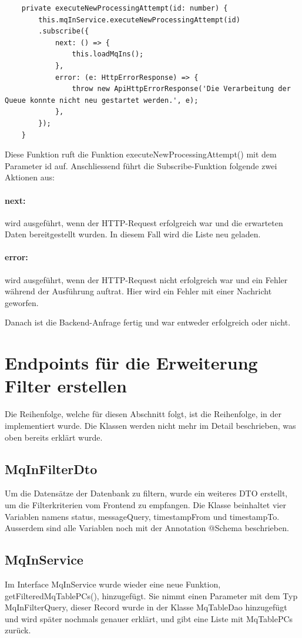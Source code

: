 \begin{verbatim}
	private executeNewProcessingAttempt(id: number) {
		this.mqInService.executeNewProcessingAttempt(id)
		.subscribe({
			next: () => {
				this.loadMqIns();
			},
			error: (e: HttpErrorResponse) => {
				throw new ApiHttpErrorResponse('Die Verarbeitung der Queue konnte nicht neu gestartet werden.', e);
			},
		});
	}
\end{verbatim}

\noindent Diese Funktion ruft die Funktion executeNewProcessingAttempt() mit dem Parameter id auf. Anschliessend führt die Subscribe-Funktion folgende zwei Aktionen aus:

\paragraph{next:} wird ausgeführt, wenn der HTTP-Request erfolgreich war und die erwarteten Daten bereitgestellt wurden. In diesem Fall wird die Liste neu geladen.
\paragraph{error:} wird ausgeführt, wenn der HTTP-Request nicht erfolgreich war und ein Fehler während der Ausführung auftrat. Hier wird ein Fehler mit einer Nachricht geworfen.\newline

\noindent Danach ist die Backend-Anfrage fertig und war entweder erfolgreich oder nicht.

\section{Endpoints für die Erweiterung Filter erstellen}
Die Reihenfolge, welche für diesen Abschnitt folgt, ist die Reihenfolge, in der implementiert wurde. Die Klassen werden nicht mehr im Detail beschrieben, was oben bereits erklärt wurde.

\subsection{MqInFilterDto}
Um die Datensätze der Datenbank zu filtern, wurde ein weiteres DTO erstellt, um die Filterkriterien vom Frontend zu empfangen. Die Klasse beinhaltet vier Variablen namens status, messageQuery, timestampFrom und timestampTo. Ausserdem sind alle Variablen noch mit der Annotation @Schema beschrieben.

\subsection{MqInService}
Im Interface MqInService wurde wieder eine neue Funktion, getFilteredMqTablePCs(), hinzugefügt. Sie nimmt einen Parameter mit dem Typ MqInFilterQuery, dieser Record wurde in der Klasse MqTableDao hinzugefügt und wird später nochmals genauer erklärt, und gibt eine Liste mit MqTablePCs zurück.

